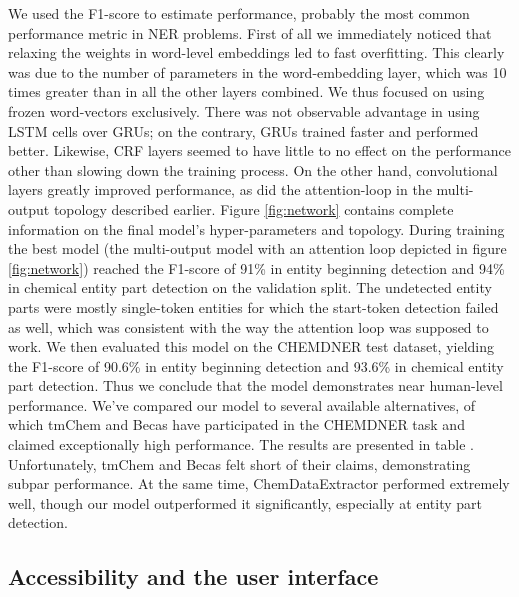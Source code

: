 \documentclass[twocolumn]{bmcart}%
\begin{document}
We used the F1-score to estimate performance, probably the most common performance metric in NER problems. 
First of all we immediately noticed that relaxing the weights in word-level embeddings led to fast overfitting.
This clearly was due to the number of parameters in the word-embedding layer, which was 10 times greater than in all the other layers combined.
We thus focused on using frozen word-vectors exclusively.
There was not observable advantage in using LSTM cells over GRUs; on the contrary, GRUs trained faster and performed better.
Likewise, CRF layers seemed to have little to no effect on the performance other than slowing down the training process.
On the other hand, convolutional layers greatly improved performance, as did the attention-loop in the multi-output topology described earlier.
Figure \ref{fig:network} contains complete information on the final model's hyper-parameters and topology.
During training the best model (the multi-output model with an attention loop depicted in figure \ref{fig:network}) reached the F1-score of 91\% in entity beginning detection and 94\% in chemical entity part detection on the validation split.
The undetected entity parts were mostly single-token entities for which the start-token detection failed as well, which was consistent with the way the attention loop was supposed to work.
We then evaluated this model on the CHEMDNER test dataset, yielding the F1-score of 90.6\% in entity beginning detection and 93.6\% in chemical entity part detection.
Thus we conclude that the model demonstrates near human-level performance.
We've compared our model to several available alternatives, of which tmChem and Becas have participated in the CHEMDNER task and claimed exceptionally high performance.
The results are presented in table \cite{tab:performance}.
Unfortunately, tmChem and Becas felt short of their claims, demonstrating subpar performance.
At the same time, ChemDataExtractor performed extremely well, though our model outperformed it significantly, especially at entity part detection.
 
\subsection*{Accessibility and the user interface}
\end{document}
